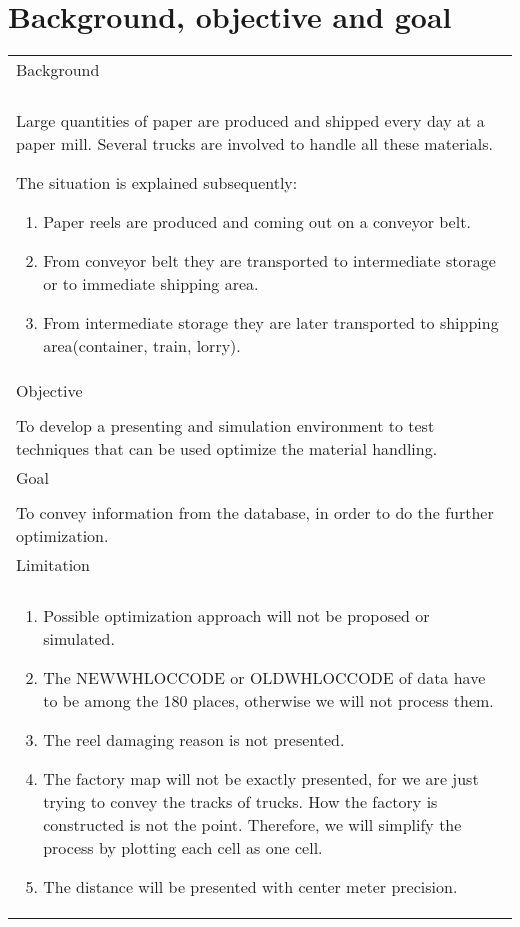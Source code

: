 \documentclass{report}
\begin{document}
\section{Background, objective and goal}
\begin{table}[h]
\begin{tabular}{| p{12cm} |}

	\hline
	Background \\
	\\
	Large quantities of paper are produced and shipped every day at a paper mill. Several trucks are involved to handle all these materials. 

	The situation is explained subsequently:
	\begin{enumerate}
	\item
	Paper reels are produced and coming out on a conveyor belt.
	\item
	From conveyor belt they are transported to intermediate storage or to immediate shipping area.
	\item
	From intermediate storage they are later transported to shipping area(container, train, lorry).
	\end{enumerate}
	\\

	\hline
		Objective \\
		\\
		To develop a presenting and simulation environment to test techniques that can be used optimize the material handling. \\
	
	\hline
		Goal \\
		\\
		To convey information from the database, in order to do the further optimization.\\

	\hline
		Limitation \\
		\\
		\begin{enumerate}
		\item
		Possible optimization approach will not be proposed or simulated.
		\item
		The NEWWHLOCCODE or OLDWHLOCCODE of data have to be among the 180 places, otherwise we will not process them.
		\item
		The reel damaging reason is not presented.
		\item
		The factory map will not be exactly presented, for we are just trying to convey the tracks of trucks. How the factory is constructed is not 
		the point. Therefore, we will simplify the process by plotting each cell as one cell.
		\item
		The distance will be presented with center meter precision.
		\end{enumerate}
		\\
	\hline

\end{tabular}
\end{table}
\end{document}
